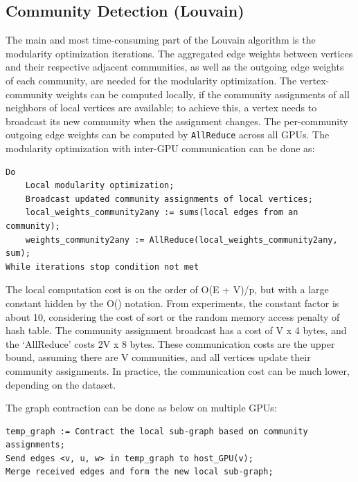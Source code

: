 \documentclass[10pt,oneside]{memoir}
\begin{document}
\hypertarget{community-detection-louvain-2}{%
\subsection{Community Detection
(Louvain)}\label{community-detection-louvain-2}}

The main and most time-consuming part of the Louvain algorithm is the
modularity optimization iterations. The aggregated edge weights between
vertices and their respective adjacent communities, as well as the
outgoing edge weights of each community, are needed for the modularity
optimization. The vertex-community weights can be computed locally, if
the community assignments of all neighbors of local vertices are
available; to achieve this, a vertex needs to broadcast its new
community when the assignment changes. The per-community outgoing edge
weights can be computed by \texttt{AllReduce} across all GPUs. The
modularity optimization with inter-GPU communication can be done as:

\begin{verbatim}
Do
    Local modularity optimization;
    Broadcast updated community assignments of local vertices;
    local_weights_community2any := sums(local edges from an community);
    weights_community2any := AllReduce(local_weights_community2any, sum);
While iterations stop condition not met
\end{verbatim}

The local computation cost is on the order of O(\textbar{}E\textbar{} +
\textbar{}V\textbar{})/p, but with a large constant hidden by the O()
notation. From experiments, the constant factor is about 10, considering
the cost of sort or the random memory access penalty of hash table. The
community assignment broadcast has a cost of \textbar{}V\textbar{} x 4
bytes, and the `AllReduce' costs 2\textbar{}V\textbar{} x 8 bytes. These
communication costs are the upper bound, assuming there are
\textbar{}V\textbar{} communities, and all vertices update their
community assignments. In practice, the communication cost can be much
lower, depending on the dataset.

The graph contraction can be done as below on multiple GPUs:

\begin{verbatim}
temp_graph := Contract the local sub-graph based on community assignments;
Send edges <v, u, w> in temp_graph to host_GPU(v);
Merge received edges and form the new local sub-graph;
\end{verbatim}
\end{document}
